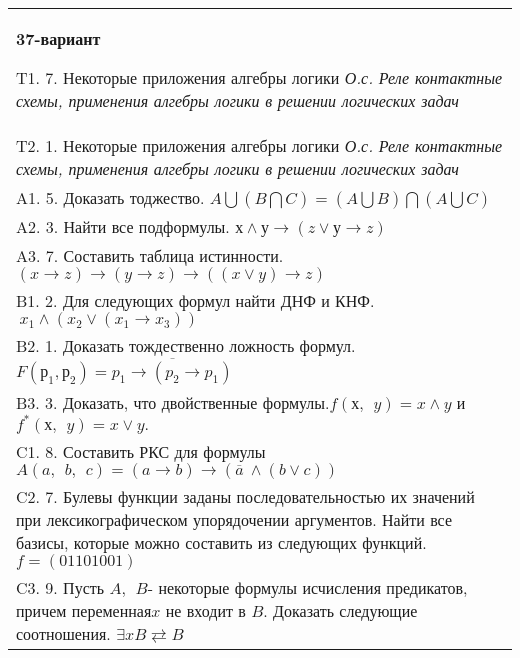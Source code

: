 \documentclass{article}
\begin{document}
\begin{tabular}{m{17cm}}
\textbf{37-вариант}
\newline

T1. 7. Некоторые приложения алгебры логики \emph{О.с. Реле контактные схемы, применения алгебры логики в решении логических задач} \\
T2. 1. Некоторые приложения алгебры логики \emph{О.с. Реле контактные схемы, применения алгебры логики в решении логических задач} \\
A1. 5. Доказать тоджество. \(A\bigcup(B\bigcap C) = (A\bigcup B)\bigcap(A\bigcup C)\) \\
A2. 3. Найти все подформулы. \(х \land у \rightarrow (z \vee у \rightarrow z)\) \\
A3. 7. Составить таблица истинности. \((x \rightarrow z) \rightarrow (y \rightarrow z) \rightarrow ((x \vee y) \rightarrow z)\) \\
B1. 2. Для следующих формул найти ДНФ и КНФ. \(\ x_{1} \land (x_{2} \vee (x_{1} \rightarrow x_{3}))\) \\
B2. 1. Доказать тождественно ложность формул. \(F\left( р_{1},р_{2} \right) = \overline{p_{1} \rightarrow (p_{2} \rightarrow p_{1})}\) \\
B3. 3. Доказать, что двойственные формулы.\(f(х,\ \ y) = x \land y\) и \(f^{*}(х,\ \ y) = x \vee y.\) \\
C1. 8. Составить РКС для формулы \(A(a,\ \ b,\ \ c) = (a \rightarrow b) \rightarrow (\overline{a}\  \land (b \vee c))\) \\
C2. 7. Булевы функции заданы последовательностью их значений при лексикографическом упорядочении аргументов. Найти все базисы, которые можно составить из следующих функций. \(f = (01101001)\) \\
C3. 9. Пусть \(A,\ \ B\)- некоторые формулы исчисления предикатов, причем переменная\(x\) не входит в \(B\). Доказать следующие соотношения. \(\exists xB \rightleftarrows B\)
 \\

\end{tabular}
\vspace{1cm}
\end{document}
